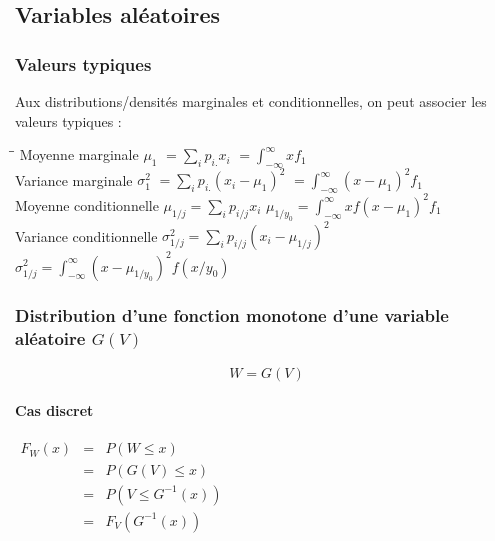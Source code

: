 \newpage
\subsection{Variables aléatoires}




\subsubsection{Valeurs typiques}
\label{valeurs-typiques}
Aux distributions/densités marginales et conditionnelles, on peut associer les valeurs typiques :
\begin{tabbing}
\hspace{5cm}\=\hspace{5cm}\=\kill
Moyenne marginale $\mu_1$       \> $= \displaystyle\sum_i p_{i.}x_i$            \> $= \displaystyle\int_{-\infty}^\infty xf_1$ \\ 
Variance marginale $\sigma_1^2$ \> $= \displaystyle\sum_i p_{i.} (x_i-\mu_1)^2$ \> $= \displaystyle\int_{-\infty}^\infty (x-\mu_1)^2 f_1$ \\
Moyenne conditionnelle          \> $\displaystyle\mu_{1/j} = \sum_i p_{i/j}x_i$              \> $\displaystyle\mu_{1/y_0} = \int_{-\infty}^\infty xf(x-\mu_1)^2f_1$\\
Variance conditionnelle         \> $\displaystyle\sigma^2_{1/j} = \sum_i p_{i/j}(x_i-\mu_{1/j})^2$ \> $\displaystyle\sigma^2_{1/j} = \int_{-\infty}^\infty (x - \mu_{1/y_0})^2 f(x/y_0)$\\
\end{tabbing}







\newpage
\subsubsection{Distribution d'une fonction monotone d'une variable aléatoire $G(V)$}
$$\boxed{W = G(V)}$$
\paragraph{Cas discret}
\begin{center}
	$\begin{array}{LLC}
    F_W(x)    &=& P(W \leq x) \\
              &=& P(G(V) \leq x) \\
              &=& P(V \leq G^{-1}(x)) \\
              &=& F_V(G^{-1}(x)) \\
	\end{array}$
\end{center}
